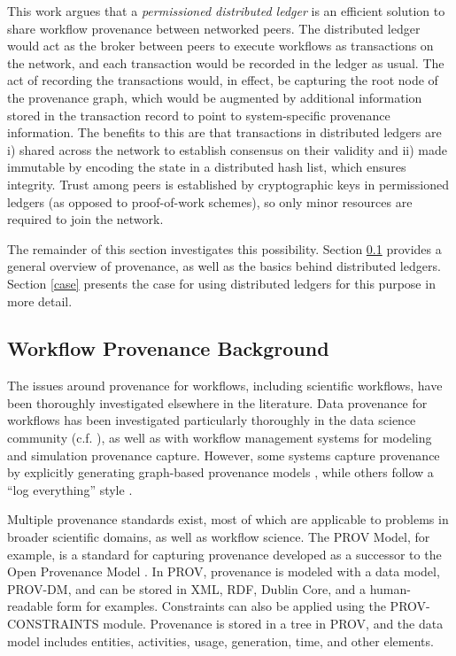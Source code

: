 This work argues that a \textit{permissioned distributed ledger} is an efficient
solution to share workflow provenance between networked peers. The distributed
ledger would act as the broker between peers to execute workflows as
transactions on the network, and each transaction would be recorded in the
ledger as usual. The act of recording the transactions would, in effect, be
capturing the root node of the provenance graph, which would be augmented by
additional information stored in the transaction record to point to
system-specific provenance information. The benefits to this are that
transactions in distributed ledgers are i) shared across the network to
establish consensus on their validity and ii) made immutable by encoding the
state in a distributed hash list, which ensures integrity. Trust among peers is
established by cryptographic keys in permissioned ledgers (as opposed to
proof-of-work schemes), so only minor resources are required to join the
network.

The remainder of this section investigates this possibility. Section
\ref{provenance-background} provides a general overview of provenance, as well
as the basics behind distributed ledgers. Section \ref{case} presents the case for using
distributed ledgers for this purpose in more detail.

\subsection{Workflow Provenance Background}
\label{provenance-background}

The issues around provenance for workflows, including scientific workflows, have
been thoroughly investigated elsewhere in the literature. Data provenance for
workflows has been investigated particularly thoroughly in the data science
community (c.f. \cite{davidson_provenance_2007}), as well as with workflow
management systems for modeling and simulation provenance capture. However,
some systems capture provenance by explicitly generating graph-based
provenance models \cite{pizzi_aiida:_2016}, while others follow a ``log
everything'' style \cite{billings_eclipse_2017}.

Multiple provenance standards exist, most of which are applicable to problems in
broader scientific domains, as well as workflow science. The PROV Model, for
example, is a standard for capturing provenance developed as a successor to the
Open Provenance Model \cite{noauthor_prov-overview_nodate}
\cite{moreau_open_2011}. In PROV, provenance is modeled with a data model,
PROV-DM, and can be stored in XML, RDF, Dublin Core, and a human-readable form
for examples. Constraints can also be applied using the PROV-CONSTRAINTS module.
Provenance is stored in a tree in PROV, and the data model includes entities,
activities, usage, generation, time, and other elements.

